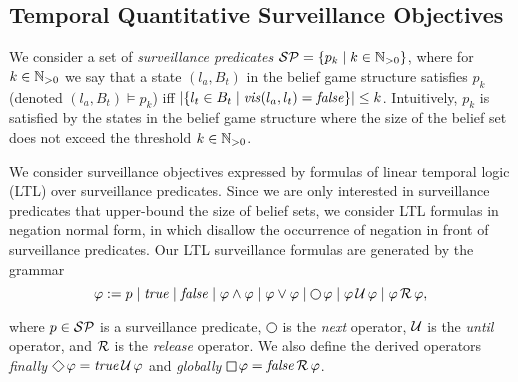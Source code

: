 \begin{itemize}
\end{itemize}

 
\begin{example}
\end{example}



\subsection{Temporal Quantitative Surveillance Objectives}

We consider a set of \emph{surveillance predicates} $\mathcal{SP} = \{p_k \mid k \in \mathbb{N}_{>0}\}$, where for $k \in \mathbb{N}_{>0}$ we say that a state $(l_a,B_t)$ in the belief game structure satisfies $p_k$ (denoted $(l_a,B_t) \models p_k$) iff 
$|\{l_t \in B_t \mid \mathit{vis}(l_a,l_t)  = \mathit{false} \}| \leq k$. Intuitively, $p_k$ is satisfied by the states in the belief game structure where the size of the belief set does not exceed the threshold $k \in \mathbb{N}_{>0}$.

We consider surveillance objectives expressed by formulas of linear temporal logic (LTL) over surveillance predicates. Since we are only interested in surveillance predicates that upper-bound the size of belief sets, we consider LTL formulas in negation normal form, in which disallow the occurrence of negation in front of surveillance predicates. Our LTL surveillance formulas  are generated by the grammar
\[\varphi := p \mid \true \mid \false \mid \varphi \wedge \varphi \mid \varphi \vee \varphi \mid \LTLnext  \varphi  \mid \varphi \LTLuntil \varphi \mid \varphi \LTLrelease \varphi,\]

where $p \in \mathcal{SP}$ is a surveillance predicate, $\LTLnext$ is the \emph{next} operator, $\operatorname{\mathcal{U}}$ is the \emph{until} operator, and $\operatorname{\mathcal{R}}$ is the \emph{release} operator. We also define the derived operators 
\emph{finally} $\LTLfinally \varphi = \true \LTLuntil \varphi$ and 
\emph{globally} $\LTLglobally \varphi = \false \LTLrelease \varphi$.

